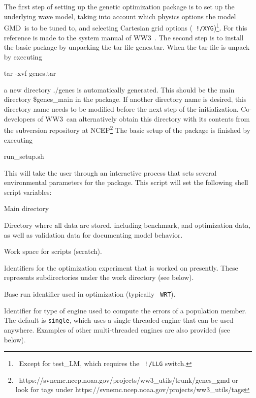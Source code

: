 \documentclass[12pt]{article}
\newcommand{\ws}{WW3}
\newcommand{\gmd}{GMD}
\newcommand{\file}{\sf}
\newcommand{\code}{\tt}
\newenvironment{plist}{\begin{list}{nofile ?}{\parsep 0mm
            \itemsep 0mm \leftmargin 35mm \labelwidth 25mm
            \rightmargin 10mm}}{\end{list}}
\newcommand{\pit}[2]{\item[{\code{#1}}\hfill]{#2}}
\begin{document}
The first step of setting up the genetic optimization package is to set up the
underlying wave model, taking into account which physics options the model
\gmd\ is to be tuned to, and selecting Cartesian grid options ({\code
!/XYG})\footnote{~Except for {\file test\_LM}, which requires the {\code
!/LLG} switch.}. For this reference is made to the system manual of \ws\
\citep{tol:MMAB09a}. The second step is to install the basic package by
unpacking the tar file {\file genes.tar}. When the tar file is unpack by
executing
\begin{center}
{\file tar -xvf genes.tar}
\end{center}
\noindent
a new directory {\file ./genes} is automatically generated. This should be the
main directory {\file \$genes\_main} in the package. If another directory name
is desired, this directory name needs to be modified before the next step of
the initialization. Co-developers of \ws\ can alternatively obtain this
directory with its contents from the subversion repository at
NCEP\footnote{~https://svnemc.ncep.noaa.gov/projects/ww3\_utils/trunk/genes\_gmd
or look for tags under https://svnemc.ncep.noaa.gov/projects/ww3\_utils/tags}
The basic setup of the package is finished by executing
\begin{center}
{\file run\_setup.sh}
\end{center}
\noindent
This will take the user through an interactive process that sets several
environmental parameters for the package. This script will set the following
shell script variables:

\begin{plist}
\pit{\$genes\_main}{Main directory}
\pit{\$genes\_data}{Directory where all data are stored, including benchmark,
                    and optimization data, as well as validation data for
		    documenting model behavior.}
\pit{\$genes\_work}{Work space for scripts (scratch).}
\pit{\$genes\_expN}{Identifiers for the optimization experiment that is worked
                    on presently. These represents subdirectories under the
                    work directory (see below).}
\pit{\$genes\_base}{Base run identifier used in optimization (typically {\code
                    WRT}).}
\pit{\$genes\_engn}{Identifier for type of engine used to compute the errors
                    of a population member. The default is {\code single},
                    which uses a single threaded engine that can be used
                    anywhere. Examples of other multi-threaded engines are
                    also provided (see below).}
\end{plist}
\end{document}
